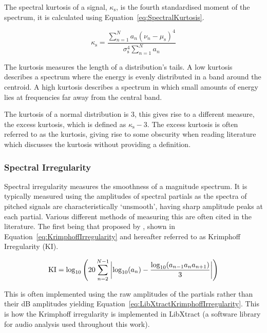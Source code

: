			The spectral kurtosis of a signal, $\kappa_{\mathrm{s}}$, is the fourth standardised moment of the
			spectrum, it is calculated using Equation~\ref{eq:SpectralKurtosis}.

			\begin{equation}
				\kappa_{\mathrm{s}} = \frac{\sum_{n = 1}^{N} a_{n}(\nu_{n} - \mu_{\mathrm{s}})^{4}}
					{\sigma_{\mathrm{s}}^{4}\sum_{n = 1}^{N} a_{n}}
				\label{eq:SpectralKurtosis}
			\end{equation}

			The kurtosis measures the length of a distribution's tails. A low kurtosis describes a spectrum
			where the energy is evenly distributed in a band around the centroid. A high kurtosis describes a
			spectrum in which small amounts of energy lies at frequencies far away from the central band.

			The kurtosis of a normal distribution is 3, this gives rise to a different measure, the excess
			kurtosis, which is defined as $\kappa_{\mathrm{s}} - 3$. The excess kurtosis is often referred to
			as the kurtosis, giving rise to some obscurity when reading literature which discusses the kurtosis
			without providing a definition.

		\subsubsection*{Spectral Irregularity}
			Spectral irregularity measures the smoothness of a magnitude spectrum. It is typically measured
			using the amplitudes of spectral partials as the spectra of pitched signals are characteristically
			`unsmooth', having sharp amplitude peaks at each partial. Various different methods of measuring
			this are often cited in the literature. The first being that proposed by
			\citet{krimphoff1994caracterisation}, shown in Equation~\ref{eq:KrimphoffIrregularity} and
			hereafter referred to as Krimphoff Irregularity ($\mathrm{KI}$).

			\begin{equation}
				\mathrm{KI} = \log_{10} \left( 20 \sum_{n = 2}^{N - 1}
						   \left|\log_{10}(a_{n}) - \frac{\log_{10}(a_{n-1}a_{n}a_{n+1})}{3}\right|
						   \right)
				\label{eq:KrimphoffIrregularity}
			\end{equation}

			This is often implemented using the raw amplitudes of the partials rather than their dB amplitudes
			yielding Equation~\ref{eq:LibXtractKrimphoffIrregularity}. This is how the Krimphoff irregularity
			is implemented in LibXtract \citep{bullock2007libxtract} (a software library for audio analysis
			used throughout this work).

